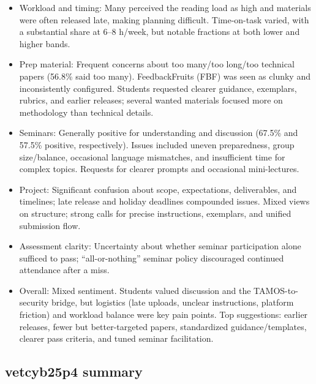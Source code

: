 \documentclass[a4paper]{report}
\begin{document}
\begin{itemize}
  \item Workload and timing: Many perceived the reading load as high and materials were often released late, making planning difficult. Time-on-task varied, with a substantial share at 6–8 h/week, but notable fractions at both lower and higher bands.
  \item Prep material: Frequent concerns about too many/too long/too technical papers (56.8\% said too many). FeedbackFruits (FBF) was seen as clunky and inconsistently configured. Students requested clearer guidance, exemplars, rubrics, and earlier releases; several wanted materials focused more on methodology than technical details.
  \item Seminars: Generally positive for understanding and discussion (67.5\% and 57.5\% positive, respectively). Issues included uneven preparedness, group size/balance, occasional language mismatches, and insufficient time for complex topics. Requests for clearer prompts and occasional mini-lectures.
  \item Project: Significant confusion about scope, expectations, deliverables, and timelines; late release and holiday deadlines compounded issues. Mixed views on structure; strong calls for precise instructions, exemplars, and unified submission flow.
  \item Assessment clarity: Uncertainty about whether seminar participation alone sufficed to pass; “all-or-nothing” seminar policy discouraged continued attendance after a miss.
  \item Overall: Mixed sentiment. Students valued discussion and the TAMOS-to-security bridge, but logistics (late uploads, unclear instructions, platform friction) and workload balance were key pain points. Top suggestions: earlier releases, fewer but better-targeted papers, standardized guidance/templates, clearer pass criteria, and tuned seminar facilitation.
\end{itemize}

\subsection*{vetcyb25p4 summary}
\end{document}
